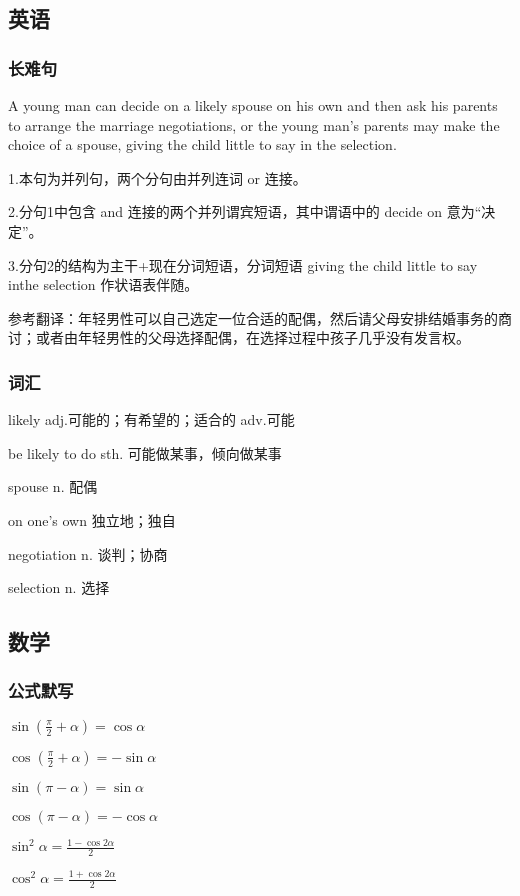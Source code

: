 \documentclass[UTF8]{ctexart}
\begin{document}
\subsection{英语}
\subsubsection{长难句}
A young man can decide on a likely spouse on his own and then ask his parents to arrange the marriage negotiations, or the young man's parents may make the choice of a spouse, giving the child little to say in the selection.

1.本句为并列句，两个分句由并列连词 or 连接。

2.分句1中包含 and 连接的两个并列谓宾短语，其中谓语中的 decide on 意为“决定”。

3.分句2的结构为主干+现在分词短语，分词短语 giving the child little to say inthe selection 作状语表伴随。

参考翻译：年轻男性可以自己选定一位合适的配偶，然后请父母安排结婚事务的商讨；或者由年轻男性的父母选择配偶，在选择过程中孩子几乎没有发言权。
\subsubsection{词汇}
likely adj.可能的；有希望的；适合的 adv.可能

be likely to do sth. 可能做某事，倾向做某事

spouse n. 配偶

on one's own 独立地；独自

negotiation n. 谈判；协商

selection n. 选择
\subsection{数学}
\subsubsection{公式默写}
\begin{multicols}{3}
      $\sin\left ( \frac{\pi}{2} + \alpha  \right ) =\cos \alpha$

      $\cos\left ( \frac{\pi}{2}+\alpha\right )=-\sin \alpha$

      $\sin \left ( \pi - \alpha\right )=\sin \alpha$

      $\cos \left ( \pi - \alpha\right )=-\cos \alpha$

      $\sin^2\alpha=\frac{1-\cos 2\alpha}{2}$

      $\cos^2\alpha=\frac{1+\cos 2\alpha}{2}$
\end{multicols}
\end{document}
